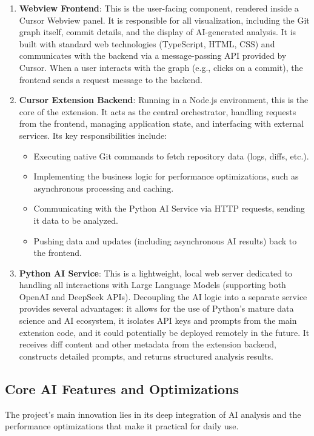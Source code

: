 \begin{enumerate}
    \item \textbf{Webview Frontend}: This is the user-facing component, rendered inside a Cursor Webview panel. It is responsible for all visualization, including the Git graph itself, commit details, and the display of AI-generated analysis. It is built with standard web technologies (TypeScript, HTML, CSS) and communicates with the backend via a message-passing API provided by Cursor. When a user interacts with the graph (e.g., clicks on a commit), the frontend sends a request message to the backend.

    \item \textbf{Cursor Extension Backend}: Running in a Node.js environment, this is the core of the extension. It acts as the central orchestrator, handling requests from the frontend, managing application state, and interfacing with external services. Its key responsibilities include:
    \begin{itemize}
        \item Executing native Git commands to fetch repository data (logs, diffs, etc.).
        \item Implementing the business logic for performance optimizations, such as asynchronous processing and caching.
        \item Communicating with the Python AI Service via HTTP requests, sending it data to be analyzed.
        \item Pushing data and updates (including asynchronous AI results) back to the frontend.
    \end{itemize}

    \item \textbf{Python AI Service}: This is a lightweight, local web server dedicated to handling all interactions with Large Language Models (supporting both OpenAI and DeepSeek APIs). Decoupling the AI logic into a separate service provides several advantages: it allows for the use of Python's mature data science and AI ecosystem, it isolates API keys and prompts from the main extension code, and it could potentially be deployed remotely in the future. It receives diff content and other metadata from the extension backend, constructs detailed prompts, and returns structured analysis results.
\end{enumerate}

\subsection{Core AI Features and Optimizations}
The project's main innovation lies in its deep integration of AI analysis and the performance optimizations that make it practical for daily use.


